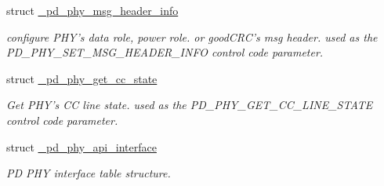 \begin{DoxyCompactItemize}
struct \hyperlink{struct__pd__phy__msg__header__info}{\-\_\-pd\-\_\-phy\-\_\-msg\-\_\-header\-\_\-info}
\begin{DoxyCompactList}\small\item\em configure P\-H\-Y's data role, power role. or good\-C\-R\-C's msg header. used as the P\-D\-\_\-\-P\-H\-Y\-\_\-\-S\-E\-T\-\_\-\-M\-S\-G\-\_\-\-H\-E\-A\-D\-E\-R\-\_\-\-I\-N\-F\-O control code parameter. \end{DoxyCompactList}\item 
struct \hyperlink{struct__pd__phy__get__cc__state}{\-\_\-pd\-\_\-phy\-\_\-get\-\_\-cc\-\_\-state}
\begin{DoxyCompactList}\small\item\em Get P\-H\-Y's C\-C line state. used as the P\-D\-\_\-\-P\-H\-Y\-\_\-\-G\-E\-T\-\_\-\-C\-C\-\_\-\-L\-I\-N\-E\-\_\-\-S\-T\-A\-T\-E control code parameter. \end{DoxyCompactList}\item 
struct \hyperlink{struct__pd__phy__api__interface}{\-\_\-pd\-\_\-phy\-\_\-api\-\_\-interface}
\begin{DoxyCompactList}\small\item\em P\-D P\-H\-Y interface table structure. \end{DoxyCompactList}\end{DoxyCompactItemize}
